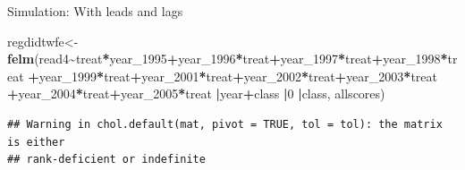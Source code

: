 \documentclass[
  ignorenonframetext,
]{beamer}
\newenvironment{Shaded}{\begin{snugshade}}{\end{snugshade}}
\newcommand{\DecValTok}[1]{\textcolor[rgb]{0.00,0.00,0.81}{#1}}
\newcommand{\FunctionTok}[1]{\textcolor[rgb]{0.13,0.29,0.53}{\textbf{#1}}}
\newcommand{\NormalTok}[1]{#1}
\newcommand{\OtherTok}[1]{\textcolor[rgb]{0.56,0.35,0.01}{#1}}
\newcommand{\SpecialCharTok}[1]{\textcolor[rgb]{0.81,0.36,0.00}{\textbf{#1}}}
\begin{document}
\begin{frame}[fragile]{Simulation: With leads and lags}
\begin{Shaded}
\begin{Highlighting}[]
\NormalTok{regdidtwfe}\OtherTok{\textless{}{-}}\FunctionTok{felm}\NormalTok{(read4}\SpecialCharTok{\textasciitilde{}}\NormalTok{treat}\SpecialCharTok{*}\NormalTok{year\_1995}\SpecialCharTok{+}\NormalTok{year\_1996}\SpecialCharTok{*}\NormalTok{treat}\SpecialCharTok{+}\NormalTok{year\_1997}\SpecialCharTok{*}\NormalTok{treat}\SpecialCharTok{+}\NormalTok{year\_1998}\SpecialCharTok{*}\NormalTok{treat}
                 \SpecialCharTok{+}\NormalTok{year\_1999}\SpecialCharTok{*}\NormalTok{treat}\SpecialCharTok{+}\NormalTok{year\_2001}\SpecialCharTok{*}\NormalTok{treat}\SpecialCharTok{+}\NormalTok{year\_2002}\SpecialCharTok{*}\NormalTok{treat}\SpecialCharTok{+}\NormalTok{year\_2003}\SpecialCharTok{*}\NormalTok{treat}
                 \SpecialCharTok{+}\NormalTok{year\_2004}\SpecialCharTok{*}\NormalTok{treat}\SpecialCharTok{+}\NormalTok{year\_2005}\SpecialCharTok{*}\NormalTok{treat}
                 \SpecialCharTok{|}\NormalTok{year}\SpecialCharTok{+}\NormalTok{class}
                 \SpecialCharTok{|}\DecValTok{0}
                 \SpecialCharTok{|}\NormalTok{class,}
\NormalTok{                 allscores)}
\end{Highlighting}
\end{Shaded}

\begin{verbatim}
## Warning in chol.default(mat, pivot = TRUE, tol = tol): the matrix is either
## rank-deficient or indefinite
\end{verbatim}
\end{frame}
\end{document}
